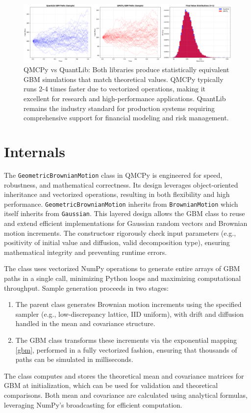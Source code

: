 \documentclass{article}
\begin{document}
\begin{figure}[h!]
\centering
\includegraphics[width=1\textwidth]{images/figure_5.png}
\caption{QMCPy vs QuantLib: Both libraries produce statistically equivalent GBM simulations that match theoretical values. QMCPy typically runs 2-4 times faster due to vectorized operations, making it excellent for research and high-performance applications. QuantLib remains the industry standard for production systems requiring comprehensive  support for financial modeling and risk management.}
\end{figure}

\section{Internals}

The \texttt{GeometricBrownianMotion} class in QMCPy is engineered for speed, robustness, and mathematical correctness. Its design leverages object-oriented inheritance and vectorized operations, resulting in both flexibility and high performance.
\texttt{GeometricBrownianMotion} inherits from \texttt{BrownianMotion} which itself inherits from \texttt{Gaussian}. This layered design allows the GBM class to reuse and extend efficient implementations for Gaussian random vectors and Brownian motion increments.
The constructosr rigorously check input parameters (e.g., positivity of initial value and diffusion, valid decomposition type), ensuring mathematical integrity and preventing runtime errors.


The class uses vectorized NumPy operations to generate entire arrays of GBM paths in a single call, minimizing Python loops and maximizing computational throughput. Sample generation proceeds in two stages:
\begin{enumerate}
\item 
The parent class generates Brownian motion increments using the specified sampler (e.g., low-discrepancy lattice, IID uniform), with drift and diffusion handled in the mean and covariance structure.
\item  The GBM class transforms these increments via the exponential mapping    \eqref{gbm}, performed in a fully vectorized fashion, ensuring that thousands of paths can be simulated in milliseconds.
\end{enumerate}
The class computes and stores the theoretical mean and covariance matrices for GBM at initialization, which can be used for validation and theoretical comparisons. Both mean and covariance are calculated using analytical formulas, leveraging NumPy’s broadcasting for efficient computation.
\end{document}
